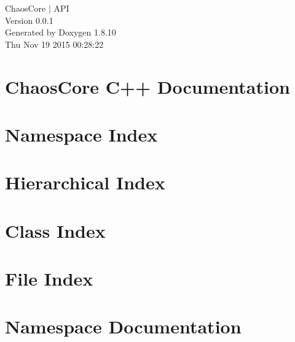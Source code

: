 \documentclass[twoside]{book}
\newcommand{\+}{\discretionary{\mbox{\scriptsize$\hookleftarrow$}}{}{}}
\newcommand{\clearemptydoublepage}{%
  \newpage{\pagestyle{empty}\cleardoublepage}%
}
\begin{document}
\hypersetup{pageanchor=false,
             bookmarks=true,
             bookmarksnumbered=true,
             pdfencoding=unicode
            }
\begin{titlepage}
\vspace*{7cm}
\begin{center}%
{\Large Chaos\+Core $\vert$ A\+P\+I \\[1ex]\large Version 0.\+0.\+1 }\\
\vspace*{1cm}
{\large Generated by Doxygen 1.8.10}\\
\vspace*{0.5cm}
{\small Thu Nov 19 2015 00:28:22}\\
\end{center}
\end{titlepage}
\clearemptydoublepage
\tableofcontents
\clearemptydoublepage
{}
\hypersetup{pageanchor=true}

\chapter{Chaos\+Core C++ Documentation}
\label{index}\hypertarget{index}{}
\chapter{Namespace Index}

\chapter{Hierarchical Index}

\chapter{Class Index}

\chapter{File Index}

\chapter{Namespace Documentation}












\end{document}

